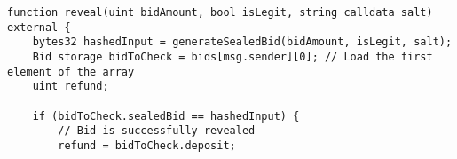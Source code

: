 \begin{lstlisting}[language=Solidity]
function reveal(uint bidAmount, bool isLegit, string calldata salt) external {
	bytes32 hashedInput = generateSealedBid(bidAmount, isLegit, salt);
	Bid storage bidToCheck = bids[msg.sender][0]; // Load the first element of the array
	uint refund;

	if (bidToCheck.sealedBid == hashedInput) {
		// Bid is successfully revealed
		refund = bidToCheck.deposit;
\end{lstlisting}